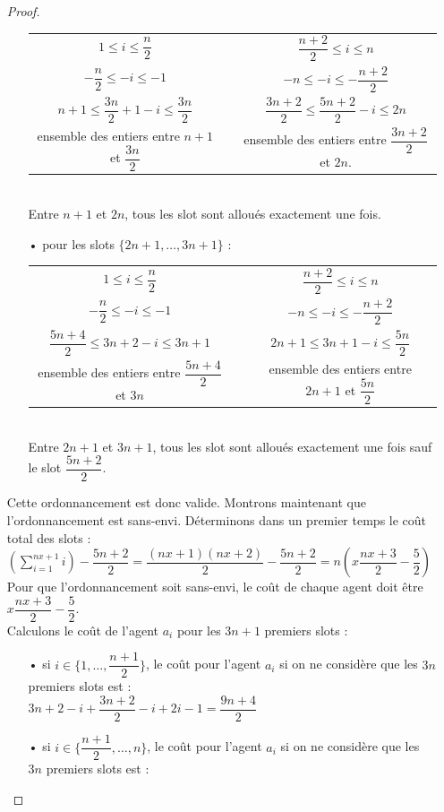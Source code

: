 \documentclass[12pt]{article}
\theoremstyle{definition}
\begin{document}
\begin{itemize}
\begin{proof}
\begin{itemize}
\begin{tabular}{ccc}
$1\leq i \leq \dfrac{n}{2}$ & & $\dfrac{n+2}{2}\leq i \leq n$\\
$-\dfrac{n}{2}\leq -i\leq -1$ & & $-n\leq -i \leq -\dfrac{n+2}{2}$\\
$n+1 \leq \dfrac{3n}{2}+1-i\leq\dfrac{3n}{2}$ & & $\dfrac{3n+2}{2}\leq \dfrac{5n+2}{2}-i\leq 2n$\\
ensemble des entiers entre $n+1$ et $\dfrac{3n}{2}$ & & ensemble des entiers entre $\dfrac{3n+2}{2}$ et $2n$. 
\end{tabular}\\
Entre $n+1$ et $2n$, tous les slot sont alloués exactement une fois.
\item[•] pour les slots $\{2n+1,\dots,3n + 1\}$ :\\
\begin{tabular}{ccc}
$1\leq i \leq \dfrac{n}{2}$ & & $\dfrac{n+2}{2}\leq i \leq n$\\
$-\dfrac{n}{2}\leq -i\leq -1$ & & $-n\leq -i \leq -\dfrac{n+2}{2}$\\
$\dfrac{5n+4}{2}\leq 3n+2-i\leq 3n+1$ & & $2n+1\leq 3n+1-i \leq \dfrac{5n}{2}$\\
ensemble des entiers entre $\dfrac{5n+4}{2}$ et $3n$ & & ensemble des entiers entre $2n + 1$ et $\dfrac{5n}{2}$
\end{tabular}\\
Entre $2n+1$ et $3n+1$, tous les slot sont alloués exactement une fois sauf le slot $\dfrac{5n+2}{2}$.\\
\end{itemize}
Cette ordonnancement est donc valide. Montrons maintenant que l'ordonnancement est sans-envi. Déterminons dans un premier temps le coût total des slots :\\
$(\sum\limits_{i=1}^{nx+1}i)-\dfrac{5n+2}{2} = 	\dfrac{(nx+1)(nx+2)}{2}-\dfrac{5n+2}{2} = n(x\dfrac{nx+3}{2}-\dfrac{5}{2})$\\
Pour que l'ordonnancement soit sans-envi, le coût de chaque agent doit être $x\dfrac{nx+3}{2}-\dfrac{5}{2}$.\\
Calculons le coût de l'agent $a_i$ pour les $3n+1$ premiers slots :
\begin{itemize}
\item[•] si $i\in \{1,\dots,\dfrac{n+1}{2}\}$, le coût pour l'agent $a_i$ si on ne considère que les $3n$ premiers slots est : \\
$3n+2-i+\dfrac{3n+2}{2}-i+2i-1 = \dfrac{9n+4}{2}$
\item[•] si $i\in \{\dfrac{n+1}{2},\dots,n\}$, le coût pour l'agent $a_i$ si on ne considère que les $3n$ premiers slots est : \\

\end{itemize}
\end{proof}
\end{itemize}
\end{document}
